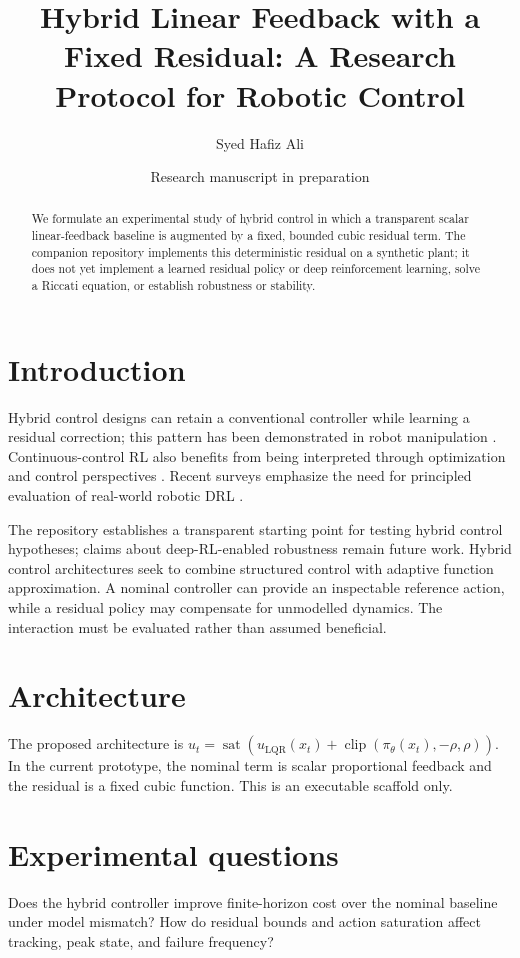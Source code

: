 \documentclass[11pt]{article}
\title{Hybrid Linear Feedback with a Fixed Residual: A Research Protocol for Robotic Control}
\author{Syed Hafiz Ali}
\date{Research manuscript in preparation}
\begin{document}
\maketitle
\begin{abstract}
We formulate an experimental study of hybrid control in which a transparent scalar linear-feedback baseline is augmented by a fixed, bounded cubic residual term. The companion repository implements this deterministic residual on a synthetic plant; it does not yet implement a learned residual policy or deep reinforcement learning, solve a Riccati equation, or establish robustness or stability.
\end{abstract}
\section{Introduction}
Hybrid control designs can retain a conventional controller while learning a residual correction; this pattern has been demonstrated in robot manipulation \cite{johannink2019residual}. Continuous-control RL also benefits from being interpreted through optimization and control perspectives \cite{recht2019tour}. Recent surveys emphasize the need for principled evaluation of real-world robotic DRL \cite{tang2025survey}.

The repository establishes a transparent starting point for testing hybrid control hypotheses; claims about deep-RL-enabled robustness remain future work. Hybrid control architectures seek to combine structured control with adaptive function approximation. A nominal controller can provide an inspectable reference action, while a residual policy may compensate for unmodelled dynamics. The interaction must be evaluated rather than assumed beneficial.
\section{Architecture}
The proposed architecture is $u_t=\operatorname{sat}(u_{\mathrm{LQR}}(x_t)+\operatorname{clip}(\pi_\theta(x_t),-\rho,\rho))$. In the current prototype, the nominal term is scalar proportional feedback and the residual is a fixed cubic function. This is an executable scaffold only.
\section{Experimental questions}
Does the hybrid controller improve finite-horizon cost over the nominal baseline under model mismatch? How do residual bounds and action saturation affect tracking, peak state, and failure frequency?
\end{document}
